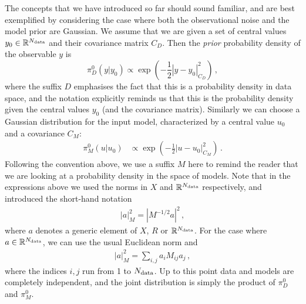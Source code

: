 The concepts that we have introduced so far should sound familiar, and are best
exemplified by considering the case where both the observational noise and the
model prior are Gaussian. We assume that we are given a set of central values
$y_0 \in \mathbb{R}^{N_{\rm data}}$ and their covariance matrix $C_D$. Then the {\em
prior} probability density of the observable $y$ is 
\begin{equation}
  \label{eq:PriorData}
  \pi_{D}^0(y|y_0) \propto \exp\left(
    -\frac12 \left| y - y_0 \right|_{C_D}^2
    \right)\, ,
\end{equation}
where the suffix $D$ emphasises the fact that this is a probability density in
data space, and the notation explicitly reminds us that this is the probability
density given the central values $y_0$ (and the covariance matrix). Similarly we
can choose a Gaussian distribution for the input model, characterized by a
central value $u_0$ and a covariance $C_M$:
\begin{align}
  \label{eq:PiZeroGauss}
  \pi_{M}^0(u|u_0)  &\propto \exp\left(
              -\frac12 \left| u - u_0 \right|_{C_M}^2
              \right)\, .
\end{align}
Following the convention above, we use a suffix $M$ here to remind the reader
that we are looking at a probability density in the space of models. Note that
in the expressions above we used the norms in $X$ and $\mathbb{R}^{N_{\rm data}}$
respectively, and introduced the short-hand notation
\begin{align}
  \left|a\right|_M^2 = \left| M^{-1/2} a\right|^2\, ,
\end{align}
where $a$ denotes a generic element of $X$, $R$ or $\mathbb{R}^{N_{\rm data}}$. For
the case where $a \in \mathbb{R}^{N_{\rm data}}$, we can use the usual Euclidean norm
and
\begin{align}
  \left| a \right|_M^2 = \sum_{i,j} a_i M_{ij} a_j\, ,
\end{align}
where the indices $i,j$ run from 1 to $N_{\rm data}$.  
Up to this point data and models are completely independent, and the joint
distribution is simply the product of $\pi_{D}^0$ and $\pi_{M}^0$. 

